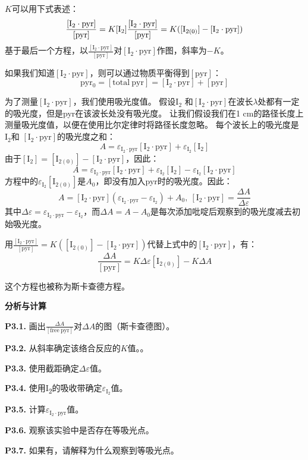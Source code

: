 \(K\)可以用下式表述： \[
\frac{[\mathrm{I_2\cdot pyr}]}{[\mathrm{pyr}]}=K[\mathrm{I_2}]\\
\frac{[\mathrm{I_2\cdot pyr}]}{[\mathrm{pyr}]}=K(\mathrm{[I_{2(0)}]-[I_2\cdot pyr]})
\]基于最后一个方程，以\(\frac{[\mathrm{I_2\cdot pyr}]}{[\mathrm{pyr}]}\)对\(\mathrm{[I_2\cdot pyr]}\)作图，斜率为\(-K\)。

如果我们知道\([\mathrm{I_2\cdot pyr}]\)，则可以通过物质平衡得到\([\mathrm{pyr}]\)：
\[
\mathrm{pyr_0=[total\ pyr]=[I_2\cdot pyr]+[pyr]}
\] 

为了测量\([\mathrm{I_2\cdot pyr}]\)，我们使用吸光度值。
假设\(\mathrm{I_2}\)
和\(\mathrm{[I_2\cdot pyr]}\)在波长\(\lambda\)处都有一定的吸光度，但是pyr在该波长处没有吸光度。
让我们假设我们在1
cm的路径长度上测量吸光度值，以便在使用比尔定律时将路径长度忽略。
每个波长上的吸光度是\(\mathrm{I_2}\)和
\(\mathrm{[I_2\cdot pyr]}\)的吸光度之和： \[
A=\varepsilon_{\mathrm{I_2\cdot pyr}}[\mathrm{I_2\cdot pyr}]+\varepsilon_{\mathrm{I_2}}[\mathrm{I_2}]
\] 由于\(\mathrm{[I_2]=[I_{2(0)}]-[I_2\cdot pyr]}\)，因此： \[
A=\varepsilon_{\mathrm{I_2\cdot pyr}}[\mathrm{I_2\cdot pyr}]+\varepsilon_{\mathrm{I_2}}[\mathrm{I_2}]-\varepsilon_{\mathrm{I_2}}[\mathrm{I_2\cdot pyr}]
\]
方程中的\(\varepsilon_{\mathrm{I_2}}[\mathrm{I_{2(0)}}]\)是\(A_0\)，即没有加入pyr时的吸光度。因此：
\[
A=[\mathrm{I_2\cdot pyr}](\varepsilon_{\mathrm{I_2\cdot pyr}}-\varepsilon_{\mathrm{I_2}})+A_0,\ [\mathrm{I_2\cdot pyr}]=\frac{\Delta A}{\Delta\varepsilon}
\]
其中\(\Delta\varepsilon=\varepsilon_{\mathrm{I_2\cdot pyr}}-\varepsilon_{\mathrm{I_2}}\)，而\(\Delta A=A-A_0\)是每次添加吡啶后观察到的吸光度减去初始吸光度。

用\(\frac{[\mathrm{I_2\cdot pyr}]}{[\mathrm{pyr}]}=K(\mathrm{[I_{2(0)}]-[I_2\cdot pyr]})\)代替上式中的\([\mathrm{I_2\cdot pyr}]\)，有：
\[
\frac{\Delta A}{[\mathrm{pyr}]}=K\Delta\varepsilon[\mathrm{I_{2(0)}}]-K\Delta A
\] 

这个方程也被称为斯卡查德方程。

\noindent\textbf{分析与计算}

\noindent\textbf{P3.1.}
画出\(\frac{\Delta A}{[\mathrm{free\ pyr}]}\)对\(\Delta A\)的图（斯卡查德图）。

\noindent\textbf{P3.2.} 从斜率确定该络合反应的\(K\)值。。

\noindent\textbf{P3.3.} 使用截距确定\(\Delta\varepsilon\)值。

\noindent\textbf{P3.4.}
使用I\textsubscript{2}的吸收带确定\(\varepsilon_{\mathrm{I_2}}\)值。

\noindent\textbf{P3.5.} 计算\(\varepsilon_{\mathrm{I_2\cdot pyr}}\)值。

\noindent\textbf{P3.6.} 观察该实验中是否存在等吸光点。

\noindent\textbf{P3.7.} 如果有，请解释为什么观察到等吸光点。
